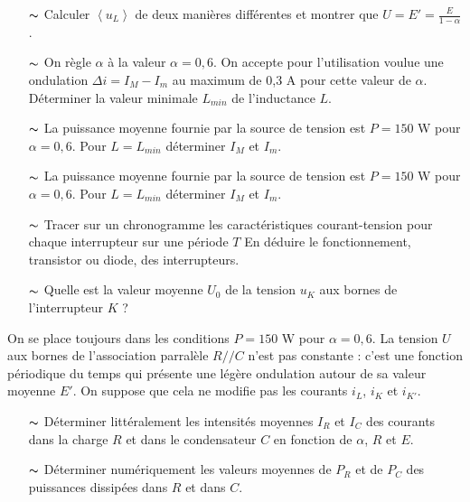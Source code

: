 \documentclass{report}
\begin{document}
\begin{itemize}

	\item[$\thicksim$] Calculer $\left\langle u_L \right\rangle$ de deux manières différentes et montrer que $U=E'=\frac{E}{1-\alpha}$.
	
	\item[$\thicksim$] On règle $\alpha$ à la valeur $\alpha=0,6$. On accepte pour l'utilisation voulue une ondulation $\Delta i=I_M-I_m$ au maximum de 0,3 A pour cette valeur de $\alpha$. Déterminer la valeur minimale $L_{min}$ de l'inductance $L$.
	
	\item[$\thicksim$] La puissance moyenne fournie par la source de tension est $P=150$ W pour $\alpha=0,6$. Pour $L=L_{min}$ déterminer $I_M$ et $I_m$.
	
	\item[$\thicksim$] La puissance moyenne fournie par la source de tension est $P=150$ W pour $\alpha=0,6$. Pour $L=L_{min}$ déterminer $I_M$ et $I_m$.
	
	\item[$\thicksim$] Tracer sur un chronogramme les caractéristiques courant-tension pour chaque interrupteur sur une période $T$ En déduire le fonctionnement, transistor ou diode, des interrupteurs. 
	
	\item[$\thicksim$] Quelle est la valeur moyenne $U_0$ de la tension $u_K$ aux bornes de l'interrupteur $K$ ? 

\end{itemize}

On se place toujours dans les conditions $P=150$ W pour $\alpha=0,6$. La tension $U$ aux bornes de l'association parralèle $R//C$ n'est pas constante : c'est une fonction périodique du temps qui présente une légère ondulation autour de sa valeur moyenne $E'$. On suppose que cela ne modifie pas les courants $i_L$, $i_K$ et $i_{K'}$.

\begin{itemize}

	\item[$\thicksim$] Déterminer littéralement les intensités moyennes $I_R$ et $I_C$ des courants dans la charge $R$ et dans le condensateur $C$ en fonction de $\alpha$, $R$ et $E$.
	
	\item[$\thicksim$] Déterminer numériquement les valeurs moyennes de $P_R$ et de $P_C$ des puissances dissipées dans $R$ et dans $C$.
	
\end{itemize}
	
\end{document}

